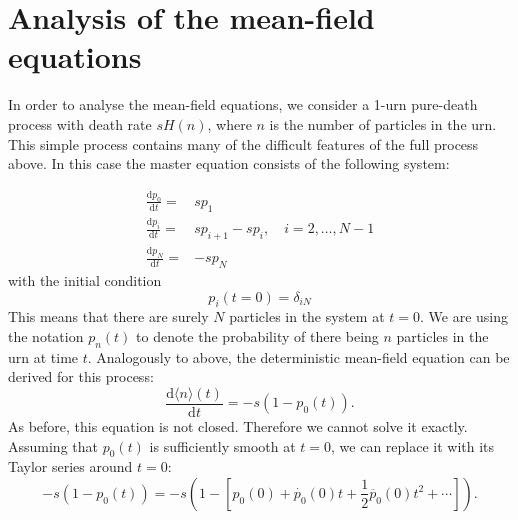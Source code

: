 \documentclass[a4paper,11pt]{article}
\numberwithin{equation}{section}
\newcommand{\diff}[2]{\frac{\mathrm{d} #1}{\mathrm{d} #2}}
\newcommand{\E}[1]{\langle #1 \rangle}
\begin{document}
\FloatBarrier
\section{Analysis of the mean-field equations}
In order to analyse the mean-field equations, we consider a 1-urn pure-death
process with death rate \(s H(n)\), where \(n\) is the number of particles in
the urn. This simple process contains many of the difficult features of the full
process above. In this case the master equation consists of the following system:

\begin{align*}
    \diff{p_0}{t} =& s p_1\\
    \diff{p_i}{t} =& s p_{i+1} - s p_i, \quad i = 2,\dotsc,N-1\\
    \diff{p_N}{t} =& - s p_N
\end{align*}
with the initial condition
\begin{equation}
    \label{eqn:pure_death_ic}
    p_i(t=0) = \delta_{iN}
\end{equation}
This means that there are surely \(N\) particles in the system at \(t=0\). We
are using the notation \(p_n(t)\) to denote the probability of there being \(n\)
particles in the urn at time \(t\).  Analogously to above, the deterministic
mean-field equation can be derived for this process:
\begin{equation*}
    \diff{\E{n}(t)}{t} = -s \left(1-p_0(t)\right).
\end{equation*}
As before, this equation is not closed. Therefore we cannot solve it exactly.
Assuming that \(p_0(t)\) is sufficiently smooth at \(t=0\), we can replace it
with its Taylor series around \(t=0\):
\begin{equation*}
    -s(1-p_0(t)) = -s\left(1 - \left[p_0(0) + \dot{p_0}(0)t +
    \frac{1}{2}\ddot{p_0}(0)t^2 + \dotsb \right] \right).
\end{equation*}
\end{document}
